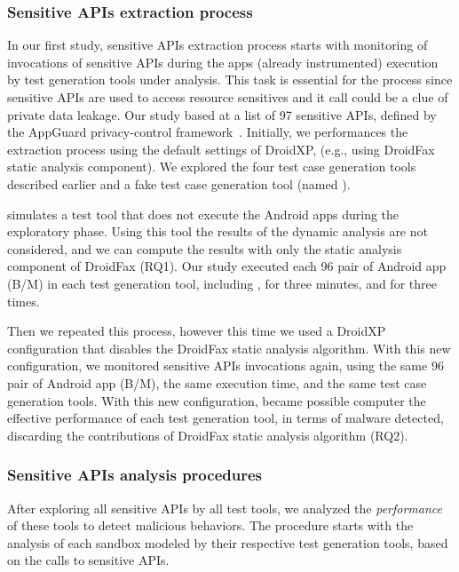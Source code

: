 \subsubsection{Sensitive APIs extraction process}


In our first study, sensitive APIs extraction process starts with monitoring of invocations of sensitive APIs during the apps (already instrumented) execution by test generation tools under analysis. This task is essential for the process since sensitive APIs are used to access resource sensitives and it call could be a clue of private data leakage. Our study based at a list of 97 sensitive APIs, defined by the AppGuard privacy-control framework~\cite{DBLP:conf/esorics/BackesGHMS13}. Initially, we performances the extraction process using the default settings of DroidXP, (e.g., using DroidFax static analysis component). We explored the four test case generation tools described earlier and a fake test case generation tool (named \joke). 

\joke simulates a test tool that does not execute the Android apps during the exploratory phase. Using this tool the results of the dynamic analysis are not considered, and we can compute the results with only the static analysis component of DroidFax (RQ1). Our study executed each 96 pair of
Android app (B/M) in each test generation tool, including \joke, for three minutes, and for three times.

Then we repeated this process, however this time we used a DroidXP configuration that disables the DroidFax static analysis algorithm.
With this new configuration, we monitored sensitive APIs invocations again, using the same 96 pair of Android app (B/M), the same execution time,
and the same test case generation tools. With this new configuration, became possible computer the effective performance of each test generation tool, in terms of malware detected, discarding the contributions of DroidFax static analysis algorithm (RQ2). 

\subsubsection{Sensitive APIs analysis procedures}

After exploring all sensitive APIs by all test tools, we analyzed the \emph{performance} of these tools to detect malicious behaviors. The procedure starts with the analysis of each sandbox modeled by their respective test generation tools, based on the calls to sensitive APIs.

